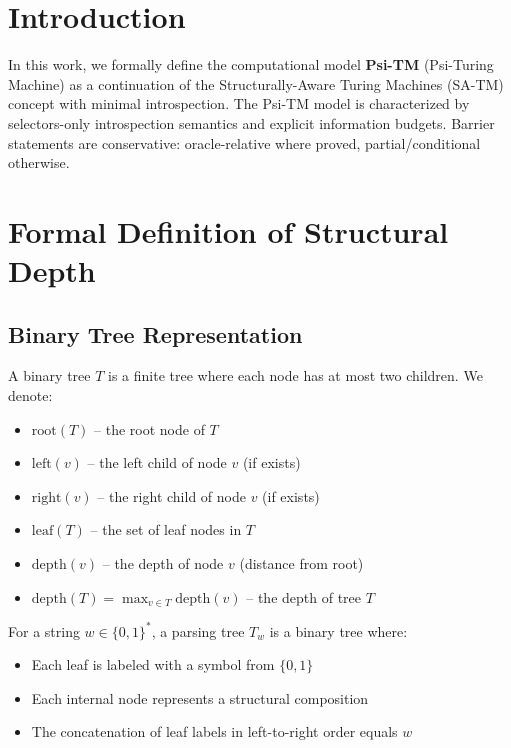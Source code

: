   
  
  \section{Introduction}\label{sec:introduction}
  
  In this work, we formally define the computational model \textbf{Psi-TM} (Psi-Turing Machine) as a continuation of the Structurally-Aware Turing Machines (SA-TM) concept with minimal introspection. The Psi-TM model is characterized by selectors-only introspection semantics and explicit information budgets. Barrier statements are conservative: oracle-relative where proved, partial/conditional otherwise.
  
  \section{Formal Definition of Structural Depth}
  
  \subsection{Binary Tree Representation}
  
  \begin{definition}
  A binary tree $T$ is a finite tree where each node has at most two children. We denote:
  \begin{itemize}
  \item $\text{root}(T)$ -- the root node of $T$
  \item $\text{left}(v)$ -- the left child of node $v$ (if exists)
  \item $\text{right}(v)$ -- the right child of node $v$ (if exists)
  \item $\text{leaf}(T)$ -- the set of leaf nodes in $T$
  \item $\text{depth}(v)$ -- the depth of node $v$ (distance from root)
  \item $\text{depth}(T) = \max_{v \in T} \text{depth}(v)$ -- the depth of tree $T$
  \end{itemize}
  \end{definition}
  
  \begin{definition}
  For a string $w \in \{0,1\}^*$, a parsing tree $T_w$ is a binary tree where:
  \begin{itemize}
  \item Each leaf is labeled with a symbol from $\{0,1\}$
  \item Each internal node represents a structural composition
  \item The concatenation of leaf labels in left-to-right order equals $w$
  \end{itemize}
  \end{definition}
  
